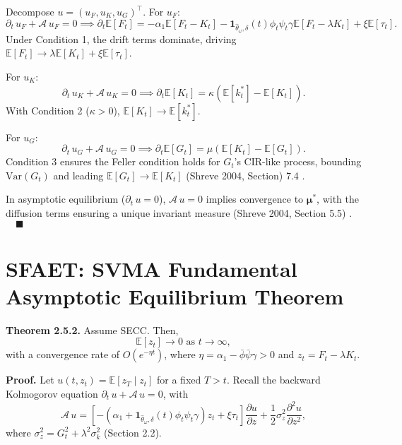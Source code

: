 \documentclass[12pt]{report}
\begin{document}
\vspace{0.2in}

Decompose \(u = (u_F, u_K, u_G)^\top\). For \(u_F\):
\[
    \partial_t\,u_F + \mathcal{A}\,u_F = 0 \implies \partial_t \mathbb{E}[F_t] = -\alpha_1 \mathbb{E}[F_t - K_t] - \mathbf{1}_{\hat{\theta}_\omega, \delta}(t) \phi_t \psi_t \gamma \mathbb{E}[F_t - \lambda K_t] + \xi \mathbb{E}[\tau_t].
\]
Under Condition 1, the drift terms dominate, driving \(\mathbb{E}[F_t] \to \lambda \mathbb{E}[K_t] + \xi \mathbb{E}[\tau_t]\).

\vspace{0.2in}

For \(u_K\):
\[
    \partial_t\,u_K + \mathcal{A}\,u_K = 0 \implies \partial_t \mathbb{E}[K_t] = \kappa (\mathbb{E}[k_t^*] - \mathbb{E}[K_t]).
\]
With Condition 2 (\(\kappa > 0\)), \(\mathbb{E}[K_t] \to \mathbb{E}[k_t^*]\).

\vspace{0.2in}

For \(u_G\):
\[
    \partial_t\,u_G + \mathcal{A}\,u_G = 0 \implies \partial_t \mathbb{E}[G_t] = \mu (\mathbb{E}[K_t] - \mathbb{E}[G_t]).
\]
Condition 3 ensures the Feller condition holds for \(G_t\)’s CIR-like process, bounding \(\text{Var}(G_t)\) and leading \(\mathbb{E}[G_t] \to \mathbb{E}[K_t]\) (Shreve 2004, Section) 7.4 \cite{shreve2004}.

\vspace{0.2in}

In asymptotic equilibrium (\(\partial_t\,u = 0\)), \(\mathcal{A}\,u = 0\) implies convergence to \(\boldsymbol{\mu}^*\), with the diffusion terms ensuring a unique invariant measure (Shreve 2004, Section 5.5) \cite{shreve2004}. \(\quad\blacksquare\)

\section{SFAET: SVMA Fundamental Asymptotic Equilibrium Theorem}

\textbf{Theorem 2.5.2.} Assume SECC. Then,
\[
    \mathbb{E}[z_t] \to 0 \text{ as } t \to \infty,
\]
with a convergence rate of \(O(e^{-\eta t})\), where \(\eta = \alpha_1 - \bar{\phi} \bar{\psi} \gamma > 0\) and \(z_t = F_t - \lambda K_t\).

\vspace{0.2in}

\textbf{Proof.} Let \(u(t, z_t) = \mathbb{E}[z_T \mid z_t]\) for a fixed \(T > t\). Recall the backward Kolmogorov equation \(\partial_t\,u + \mathcal{A}\,u = 0\), with
\[
    \mathcal{A}\,u = [-(\alpha_1 + \mathbf{1}_{\hat{\theta}_\omega, \delta}(t) \phi_t \psi_t \gamma) z_t + \xi \tau_t] \frac{\partial u}{\partial z} + \frac{1}{2} \sigma_z^2 \frac{\partial^2 u}{\partial z^2},
\]
where \(\sigma_z^2 = G_t^2 + \lambda^2 \sigma_k^2\) (Section 2.2).
\end{document}
